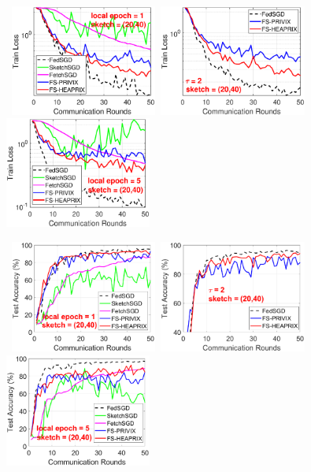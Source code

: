 \documentclass{article} %
\begin{document}
\begin{figure}[h]
	\begin{center}
		\mbox{%
		\includegraphics[width=1.9in]{MNIST_figures/local1_sketch20_iid0_train_loss.eps}%
		\includegraphics[width=1.9in]{MNIST_figures/local2_sketch20_iid0_train_loss.eps}%
		\includegraphics[width=1.9in]{MNIST_figures/local5_sketch20_iid0_train_loss.eps} }
		
		\mbox{%
		\includegraphics[width=1.9in]{MNIST_figures/local1_sketch20_iid0_test_acc.eps} %
		\includegraphics[width=1.9in]{MNIST_figures/local2_sketch20_iid0_test_acc.eps} %
		\includegraphics[width=1.9in]{MNIST_figures/local5_sketch20_iid0_test_acc.eps}
		}
		

\end{center}
\end{figure}
\end{document}
